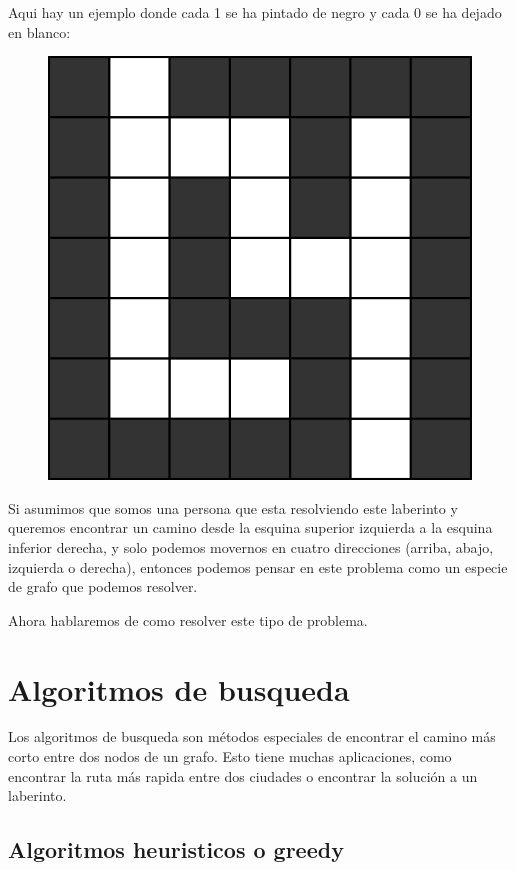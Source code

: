 \documentclass{article}
\begin{document}
Aqui hay un ejemplo donde cada 1 se ha pintado de negro y cada 0 se ha dejado en blanco:

\begin{figure}[H]
    \centering
    \includegraphics[width=0.2\paperwidth]{grafo2d}
\end{figure}

Si asumimos que somos una persona que esta resolviendo este laberinto y queremos encontrar un camino desde la esquina superior izquierda a la esquina inferior derecha, y solo podemos movernos en cuatro direcciones (arriba, abajo, izquierda o derecha), entonces podemos pensar en este problema como un especie de grafo que podemos resolver.

Ahora hablaremos de como resolver este tipo de problema.

\section{Algoritmos de busqueda}

Los algoritmos de busqueda son métodos especiales de encontrar el camino más corto entre dos nodos de un grafo. Esto tiene muchas aplicaciones, como encontrar la ruta más rapida entre dos ciudades o encontrar la solución a un laberinto.

\subsection{Algoritmos heuristicos o greedy}
\end{document}
